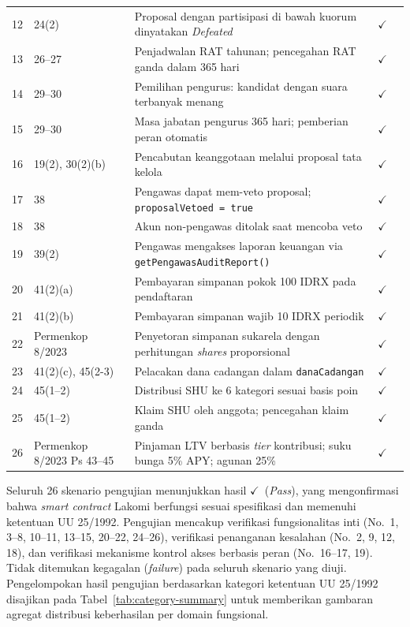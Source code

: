 \begin{table}[H]
\begin{tabular}{p{}p{}p{}p{}p{}}
12 & 24(2) & Proposal dengan partisipasi di bawah kuorum dinyatakan \textit{Defeated} & $\checkmark$ \\
13 & 26--27 & Penjadwalan RAT tahunan; pencegahan RAT ganda dalam 365 hari & $\checkmark$ \\
14 & 29--30 & Pemilihan pengurus: kandidat dengan suara terbanyak menang & $\checkmark$ \\
15 & 29--30 & Masa jabatan pengurus 365 hari; pemberian peran otomatis & $\checkmark$ \\
16 & 19(2), 30(2)(b) & Pencabutan keanggotaan melalui proposal tata kelola & $\checkmark$ \\
17 & 38 & Pengawas dapat mem-veto proposal; \texttt{proposalVetoed = true} & $\checkmark$ \\
18 & 38 & Akun non-pengawas ditolak saat mencoba veto & $\checkmark$ \\
19 & 39(2) & Pengawas mengakses laporan keuangan via \texttt{getPengawasAuditReport()} & $\checkmark$ \\
20 & 41(2)(a) & Pembayaran simpanan pokok 100 IDRX pada pendaftaran & $\checkmark$ \\
21 & 41(2)(b) & Pembayaran simpanan wajib 10 IDRX periodik & $\checkmark$ \\
22 & Permenkop 8/2023 & Penyetoran simpanan sukarela dengan perhitungan \textit{shares} proporsional & $\checkmark$ \\
23 & 41(2)(c), 45(2-3) & Pelacakan dana cadangan dalam \texttt{danaCadangan} & $\checkmark$ \\
24 & 45(1--2) & Distribusi SHU ke 6 kategori sesuai basis poin & $\checkmark$ \\
25 & 45(1--2) & Klaim SHU oleh anggota; pencegahan klaim ganda & $\checkmark$ \\
26 & Permenkop 8/2023 Ps 43--45 & Pinjaman LTV berbasis \textit{tier} kontribusi; suku bunga 5\% APY; agunan 25\% & $\checkmark$ \\
\bottomrule
\end{tabular}
\end{table}

Seluruh 26 skenario pengujian menunjukkan hasil $\checkmark$\ (\textit{Pass}), yang mengonfirmasi bahwa \textit{smart contract} Lakomi berfungsi sesuai spesifikasi dan memenuhi ketentuan UU 25/1992. Pengujian mencakup verifikasi fungsionalitas inti (No.~1, 3--8, 10--11, 13--15, 20--22, 24--26), verifikasi penanganan kesalahan (No.~2, 9, 12, 18), dan verifikasi mekanisme kontrol akses berbasis peran (No.~16--17, 19). Tidak ditemukan kegagalan (\textit{failure}) pada seluruh skenario yang diuji. Pengelompokan hasil pengujian berdasarkan kategori ketentuan UU 25/1992 disajikan pada Tabel~\ref{tab:category-summary} untuk memberikan gambaran agregat distribusi keberhasilan per domain fungsional.

